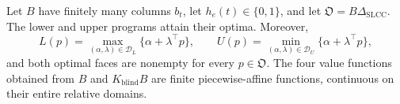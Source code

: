 Let \(B\) have finitely many columns \(b_t\), let \(h_e(t)\in\{0,1\}\), and let \(\mathfrak O=B\Delta_{\mathrm{SLCC}}\).  The lower and upper programs attain their optima.  Moreover,
\[
L(p)=\max_{(\alpha,\lambda)\in\mathcal D_L}\{\alpha+\lambda^{\top}p\},
\qquad
U(p)=\min_{(\alpha,\lambda)\in\mathcal D_U}\{\alpha+\lambda^{\top}p\},
\]
and both optimal faces are nonempty for every \(p\in\mathfrak O\).  The four value functions obtained from \(B\) and \(K_{\mathrm{blind}}B\) are finite piecewise-affine functions, continuous on their entire relative domains.
